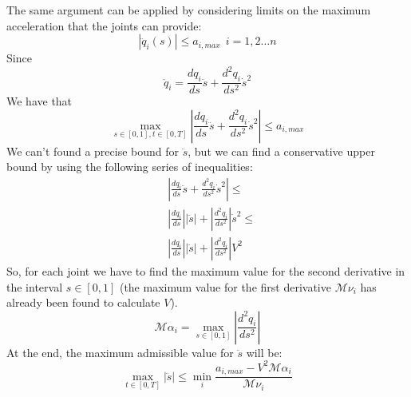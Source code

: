 \documentclass[10pt, letterpaper]{report}
\begin{document}
The same argument can be applied by considering limits on the maximum acceleration that the joints can provide:
\begin{equation}
    |\ddot q_i(s)|\le a_{i,max}  \ \ i=1,2\dots n
\end{equation}
Since\begin{equation}
    \ddot q_i=\frac{dq_i}{ds}\ddot s + \frac{d^2q_i}{ds^2}\dot s^2
\end{equation}
We have that\begin{equation}
    \max_{s\in[0,1], t\in [0,T]} \left|
    \frac{dq_i}{ds}\ddot s + \frac{d^2q_i}{ds^2}\dot s^2
    \right|\le a_{i,max}
\end{equation}
We can't found a precise bound for $\ddot s$, but we can find a conservative upper bound by using the following series of inequalities:\begin{align}
   & \left|
    \frac{dq_i}{ds}\ddot s + \frac{d^2q_i}{ds^2}\dot s^2
   \right|\le \\ 
   &\left|
    \frac{dq_i}{ds}\right| \left|\ddot s\right| +  \left|\frac{d^2q_i}{ds^2}  \right|\dot s^2
 \le \\ 
 &\left|
    \frac{dq_i}{ds}\right| \left|\ddot s\right| +  \left|\frac{d^2q_i}{ds^2}  \right|V^2
\end{align}
So, for each joint we have to find the maximum value for the second derivative in the interval $s\in [0,1]$ (the maximum value for the first derivative ${\mathcal{M}\nu_i}$ has already been found to calculate $V$).\begin{equation}
    {\mathcal{M}\alpha_i}=\max_{s\in[0,1]}\left|
        \frac{d^2q_i}{ds^2}
    \right|
\end{equation}
At the end, the maximum admissible value for $\ddot s$ will be:\begin{equation}
    \max_{t\in [0,T]}|\ddot s|\le \min_i\frac{a_{i,max}-V^2{\mathcal{M}\alpha_i}}{{\mathcal{M}\nu_i}}
\end{equation}
\end{document}
